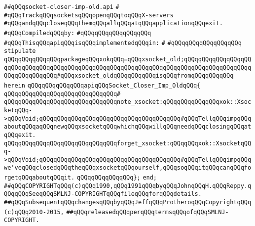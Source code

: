 \label{src/lib/x-kit/xclient/src/wire/socket-closer-imp-old.api}
\verb|##qQQqsocket-closer-imp-old.api|\newline
\verb|#|\newline
\verb|#qQQqTrackqQQqsocketsqQQqopenqQQqtoqQQqX-servers|\newline
\verb|#qQQqandqQQqcloseqQQqthemqQQqallqQQqatqQQqapplicationqQQqexit.|\newline
\newline
\verb|#qQQqCompiledqQQqby:|\newline
\verb|#qQQqqQQqqQQqqQQqqQQq|\newline
\newline
\newline
\verb|#qQQqThisqQQqapiqQQqisqQQqimplementedqQQqin:|\newline
\verb|#|\newline
\verb|#qQQqqQQqqQQqqQQqqQQq|\newline
\newline
\verb|stipulate|\newline
\verb|qQQqqQQqqQQqqQQqpackageqQQqxokqQQq=qQQqxsocket_old;qQQqqQQqqQQqqQQqqQQqqQQqqQQqqQQqqQQqqQQqqQQqqQQqqQQqqQQqqQQqqQQqqQQqqQQqqQQqqQQqqQQqqQQqqQQqqQQqqQQqqQQq#qQQqxsocket_oldqQQqqQQqqQQqisqQQqfromqQQqqQQqqQQq|\newline
\verb|herein|\newline
\newline
\verb|qQQqqQQqqQQqqQQqapiqQQqSocket_Closer_Imp_OldqQQq{|\newline
\verb|qQQqqQQqqQQqqQQqqQQqqQQqqQQqqQQq#|\newline
\verb|qQQqqQQqqQQqqQQqqQQqqQQqqQQqqQQqnote_xsocket:qQQqqQQqqQQqqQQqxok::XsocketqQQq->qQQqVoid;qQQqqQQqqQQqqQQqqQQqqQQqqQQqqQQqqQQqqQQq#qQQqTellqQQqimpqQQqaboutqQQqaqQQqnewqQQqxsocketqQQqwhichqQQqwillqQQqneedqQQqclosingqQQqatqQQqexit.|\newline
\verb|qQQqqQQqqQQqqQQqqQQqqQQqqQQqqQQqforget_xsocket:qQQqqQQqxok::XsocketqQQq->qQQqVoid;qQQqqQQqqQQqqQQqqQQqqQQqqQQqqQQqqQQqqQQq#qQQqTellqQQqimpqQQqwe'veqQQqclosedqQQqtheqQQqxsocketqQQqourself,qQQqsoqQQqitqQQqcanqQQqforgetqQQqaboutqQQqit.|\newline
\verb|qQQqqQQqqQQqqQQq};|\newline
\newline
\verb|end;|\newline
\newline
\verb|##qQQqCOPYRIGHTqQQq(c)qQQq1990,qQQq1991qQQqbyqQQqJohnqQQqH.qQQqReppy.qQQqqQQqSeeqQQqSMLNJ-COPYRIGHTqQQqfileqQQqforqQQqdetails.|\newline
\verb|##qQQqSubsequentqQQqchangesqQQqbyqQQqJeffqQQqProtheroqQQqCopyrightqQQq(c)qQQq2010-2015,|\newline
\verb|##qQQqreleasedqQQqperqQQqtermsqQQqofqQQqSMLNJ-COPYRIGHT.|\newline

